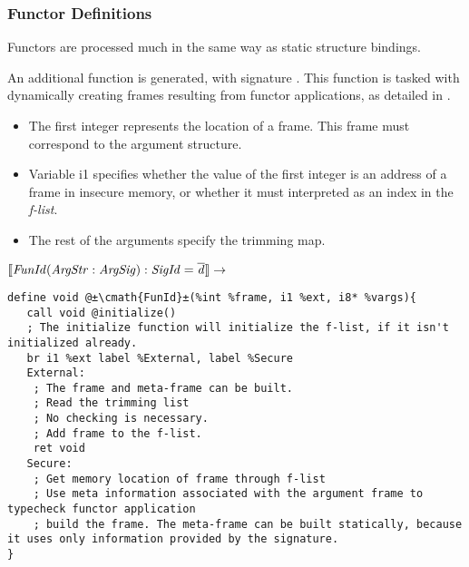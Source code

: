 \subsubsection{Functor Definitions}
Functors are processed much in the same way as static structure bindings.

An additional function is generated, with signature .
This function is tasked with dynamically creating frames resulting from functor applications, as detailed in .

\begin{itemize}
\item
The first integer represents the location of a frame. 
This frame must correspond to the argument structure.

\item
Variable i1 specifies whether the value of the first integer is an address of a frame in insecure memory, or whether it must interpreted as an index in the \emph{f-list}.

\item
The rest of the arguments specify the trimming map.
\end{itemize}

$\llbracket\mathit{FunId(ArgStr:ArgSig):SigId = \overline{d}}\rrbracket \rightarrow$

\begin{lstlisting}[language={[x86masm]Assembler}]
define void @±\cmath{FunId}±(%int %frame, i1 %ext, i8* %vargs){
   call void @initialize()
   ; The initialize function will initialize the f-list, if it isn't initialized already.
   br i1 %ext label %External, label %Secure
   External:
    ; The frame and meta-frame can be built.
    ; Read the trimming list
    ; No checking is necessary.
    ; Add frame to the f-list.
    ret void
   Secure:
    ; Get memory location of frame through f-list
    ; Use meta information associated with the argument frame to typecheck functor application
    ; build the frame. The meta-frame can be built statically, because it uses only information provided by the signature.
}
\end{lstlisting}

